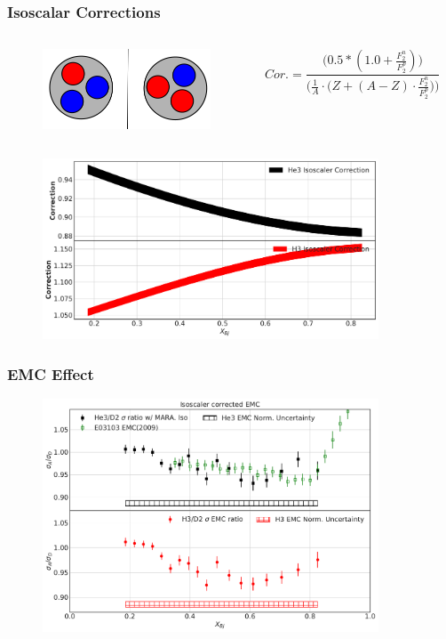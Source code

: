 \documentclass[12pt]{beamer}
\begin{document}
\begin{frame}{}
\frametitle{Isoscalar Corrections}
\vspace*{-1cm}
\begin{columns}
\begin{figure}
	\includegraphics[width =5cm]{../images/mirror}
\end{figure}
\begin{equation}
Cor. = \frac{\Big(0.5*(1.0 + \frac{F_2^n}{F_2^p})\Big)}{ \Big(\frac{1}{A} \cdot \big(Z+(A-Z)\cdot \frac{F_2^n}{F_2^p}\big) \Big) }\nonumber
\end{equation}
\end{columns}

\begin{figure}
	\includegraphics[width =10cm]{../images/IsoCor.pdf}
\end{figure}

\end{frame}
\begin{frame}{}
\frametitle{EMC Effect}
\begin{figure}
	\includegraphics[width=10cm]{../images/EMCIsotwo.pdf}
\end{figure}


\end{frame}
\end{document}
